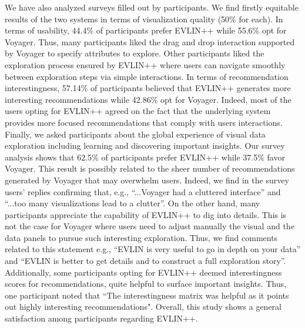 We have also analyzed surveys filled out by participants.
We find firstly equitable results of the two systems in terms of visualization quality (50\% for each).
In terms of usability, 44.4\% of participants prefer EVLIN++ while 55.6\% opt for Voyager. Thus, many participants liked the drag and drop interaction supported by Voyager to specify attributes to explore. Other participants liked the exploration process ensured by EVLIN++ where users can navigate smoothly between exploration steps via simple interactions.
In terms of recommendation interestingness, 57.14\% of participants believed that EVLIN++ generates more interesting recommendations while 42.86\% opt for Voyager. Indeed, most of the users opting for EVLIN++ agreed on the fact that the underlying system provides more focused recommendations that comply with users interactions.
 Finally, we asked participants about the global experience of visual data exploration including learning and discovering important insights. Our survey analysis shows that 62.5\% of participants prefer EVLIN++ while 37.5\% favor Voyager. 
This result is possibly related to the sheer number of recommendations generated by Voyager that may overwhelm users. Indeed, we find in the survey users' replies confirming that, e.g.,  ``...Voyager had a cluttered interface''  and
``...too many visualizations lead to a clutter''.  On the other hand, many participants appreciate the capability of EVLIN++ to dig into details. This is not the case for Voyager where users need to adjust manually the visual and the data panels to pursue such interesting exploration. Thus, we find comments related to this statement e.g., ``EVLIN is very useful to  go in depth on your data'' and ``EVLIN is better to get details and to construct a full exploration story''.  Additionally, some participants opting for EVLIN++ deemed interestingness scores for recommendations, quite helpful to surface important insights. Thus, one participant noted that ``The interestingness matrix was helpful as it points out highly interesting recommendations".
Overall, this study shows a general satisfaction among participants regarding EVLIN++.

